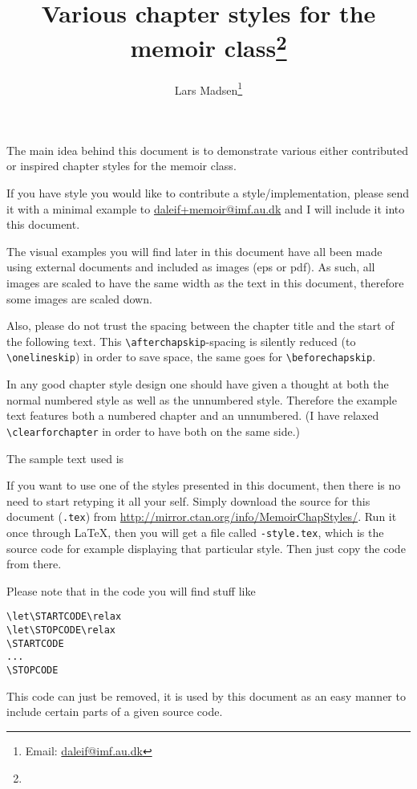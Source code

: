 \title{Various chapter styles for the memoir class\thanks{\MyFileVersion}}
\author{Lars Madsen\thanks{Email: \protect\url{daleif@imf.au.dk}}}
\maketitle

The main idea behind this document is to demonstrate various either
contributed or inspired chapter styles for the memoir class.

If you have style you would like to contribute a style/implementation,
please send it with a minimal example to \url{daleif+memoir@imf.au.dk}
and I will include it into this document.

\bigskip
\starbreak

\bigskip


\noindent The visual examples you will find later in this document
have all been made using external documents and included as images
(eps or pdf). As such, all images are scaled to have the same width as
the  text in this document, therefore some images are scaled down.

Also, please do not trust the spacing between the chapter title and
the start of the following text. This \verb+\afterchapskip+-spacing is
silently reduced (to \verb+\onelineskip+) in order to save space, the
same goes for \verb+\beforechapskip+.

\starbreak

In any good chapter style design one should have given a thought at
both the normal numbered style as well as the unnumbered
style. Therefore the example text features both a numbered chapter and
an unnumbered. (I have relaxed \verb+\clearforchapter+ in order to
have both on the same side.)

The sample text used is

\starbreak

If you want to use one of the styles presented in this document, 
then there is no need to start retyping it all your self. Simply
download the source for this document (\texttt{\jobname.tex}) from
\url{http://mirror.ctan.org/info/MemoirChapStyles/}. Run it
once through \LaTeX, then you will 
get a file called \texttt{-style.tex}, which is the
source code for example displaying that particular style. Then just
copy the code from there.

Please note that in the code you will find stuff like
\begin{Verbatim}
\let\STARTCODE\relax 
\let\STOPCODE\relax 
\STARTCODE
...
\STOPCODE  
\end{Verbatim}
This code can just be removed, it is used by this document as an easy
manner to include certain parts of a given source code.

